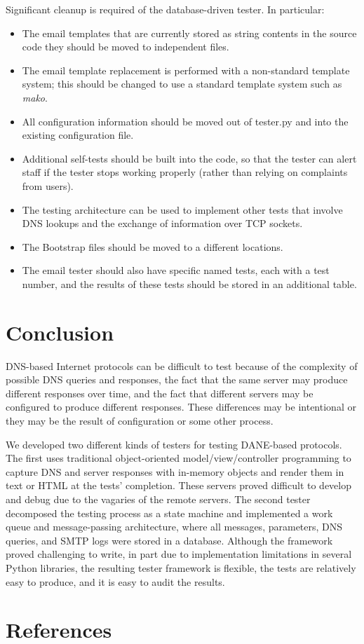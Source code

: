 \documentclass[preprint,3p,11pt]{elsarticle}
\begin{document}
Significant cleanup is required of the database-driven
tester. In particular:
\begin{itemize}
\item The email templates that are currently stored as string contents in
the source code they should be moved to independent files. 
\item The email template replacement is performed with a
non-standard template system; this should be changed to use a
standard template system such as \emph{mako}.
\item All configuration information should be moved out of tester.py
  and into the existing configuration file.
\item Additional self-tests should be built into the code, so that the
  tester can alert staff if the tester stops working properly (rather
  than relying on complaints from users).
\item The testing architecture can be used to implement other tests
  that involve DNS lookups and the exchange of information over TCP
  sockets.
\item The Bootstrap files should be moved to a different locations.
\item The email tester should also have specific named tests, each
  with a test number, and the results of these tests should be stored
  in an additional table.

\end{itemize}

\section{Conclusion}

DNS-based Internet protocols can be difficult to test because of the
complexity of possible DNS queries and responses, the fact that
the same server may produce different responses over time, and the
fact that different servers may be configured to produce different
responses. These differences may be intentional or they may be the
result of configuration or some other process. 

We developed two different kinds of testers for testing DANE-based
protocols. The first uses traditional object-oriented
model/view/controller programming to capture DNS and server responses
with in-memory objects and render them in text or HTML at the tests'
completion. These servers proved difficult to develop and debug due to
the vagaries of the remote servers. The second tester decomposed the
testing process as a state machine and implemented a work queue and message-passing
architecture, where all messages, parameters, DNS queries, and SMTP
logs were stored in a database. Although the framework proved
challenging to write, in part due to implementation limitations in several
Python libraries, the resulting tester framework is flexible, the
tests are relatively easy to produce, and it is easy to audit the results.



\section*{References}


\end{document}
